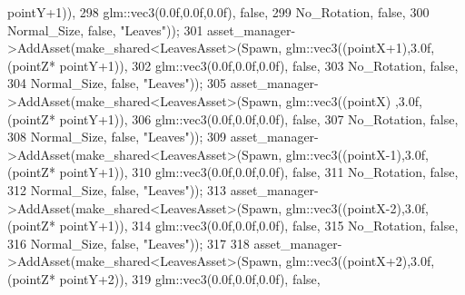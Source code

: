 \begin{DoxyCode}
      pointY+1)),
298                                                              glm::vec3(0.0f,0.0f,0.0f), \textcolor{keyword}{false},
299                                                              No\_Rotation, \textcolor{keyword}{false},
300                                                              Normal\_Size, \textcolor{keyword}{false}, \textcolor{stringliteral}{"Leaves"}));
301             asset\_manager->AddAsset(make\_shared<LeavesAsset>(Spawn, glm::vec3((pointX+1),3.0f,(pointZ*
      pointY+1)),
302                                                              glm::vec3(0.0f,0.0f,0.0f), \textcolor{keyword}{false},
303                                                              No\_Rotation, \textcolor{keyword}{false},
304                                                              Normal\_Size, \textcolor{keyword}{false}, \textcolor{stringliteral}{"Leaves"}));
305             asset\_manager->AddAsset(make\_shared<LeavesAsset>(Spawn, glm::vec3((pointX)  ,3.0f,(pointZ*
      pointY+1)),
306                                                              glm::vec3(0.0f,0.0f,0.0f), \textcolor{keyword}{false},
307                                                              No\_Rotation, \textcolor{keyword}{false},
308                                                              Normal\_Size, \textcolor{keyword}{false}, \textcolor{stringliteral}{"Leaves"}));
309             asset\_manager->AddAsset(make\_shared<LeavesAsset>(Spawn, glm::vec3((pointX-1),3.0f,(pointZ*
      pointY+1)),
310                                                              glm::vec3(0.0f,0.0f,0.0f), \textcolor{keyword}{false},
311                                                              No\_Rotation, \textcolor{keyword}{false},
312                                                              Normal\_Size, \textcolor{keyword}{false}, \textcolor{stringliteral}{"Leaves"}));
313             asset\_manager->AddAsset(make\_shared<LeavesAsset>(Spawn, glm::vec3((pointX-2),3.0f,(pointZ*
      pointY+1)),
314                                                              glm::vec3(0.0f,0.0f,0.0f), \textcolor{keyword}{false},
315                                                              No\_Rotation, \textcolor{keyword}{false},
316                                                              Normal\_Size, \textcolor{keyword}{false}, \textcolor{stringliteral}{"Leaves"}));
317  
318             asset\_manager->AddAsset(make\_shared<LeavesAsset>(Spawn, glm::vec3((pointX+2),3.0f,(pointZ*
      pointY+2)),
319                                                              glm::vec3(0.0f,0.0f,0.0f), \textcolor{keyword}{false},

\end{DoxyCode}
